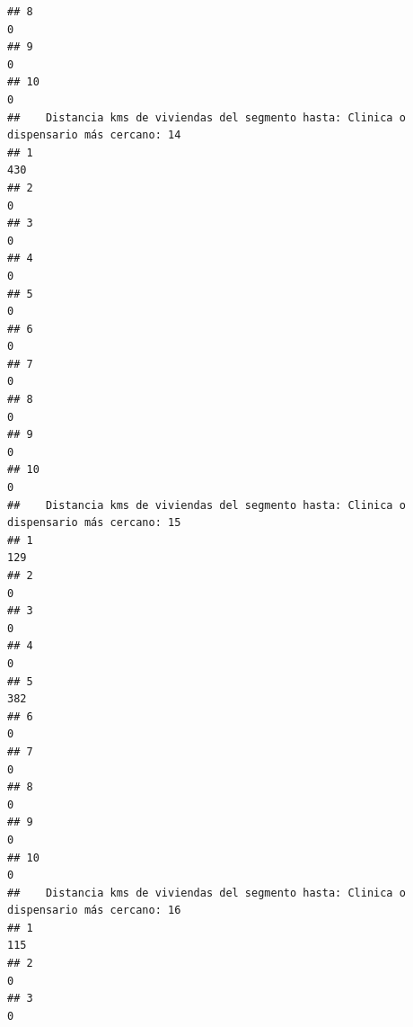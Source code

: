 \documentclass[11pt,]{article}
\begin{document}
\begin{verbatim}
## 8                                                                                     0
## 9                                                                                     0
## 10                                                                                    0
##    Distancia kms de viviendas del segmento hasta: Clinica o dispensario más cercano: 14
## 1                                                                                   430
## 2                                                                                     0
## 3                                                                                     0
## 4                                                                                     0
## 5                                                                                     0
## 6                                                                                     0
## 7                                                                                     0
## 8                                                                                     0
## 9                                                                                     0
## 10                                                                                    0
##    Distancia kms de viviendas del segmento hasta: Clinica o dispensario más cercano: 15
## 1                                                                                   129
## 2                                                                                     0
## 3                                                                                     0
## 4                                                                                     0
## 5                                                                                   382
## 6                                                                                     0
## 7                                                                                     0
## 8                                                                                     0
## 9                                                                                     0
## 10                                                                                    0
##    Distancia kms de viviendas del segmento hasta: Clinica o dispensario más cercano: 16
## 1                                                                                   115
## 2                                                                                     0
## 3                                                                                     0

\end{verbatim}
\end{document}
